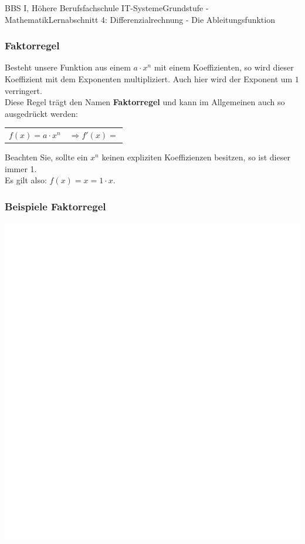 \documentclass[11pt,twocolumn,oneside,openany,headings=optiontotoc,11pt,numbers=noenddot]{article}
\begin{document}
\begin{worksheet}{BBS I, Höhere Berufsfachschule IT-Systeme}{Grundstufe - Mathematik}{Lernabschnitt 4: Differenzialrechnung - Die Ableitungsfunktion}
		\subsubsection{Faktorregel}
		Besteht unsere Funktion aus einem \(a\cdot x^n\) mit einem Koeffizienten, so wird dieser Koeffizient mit dem Exponenten multipliziert. Auch hier wird der Exponent um \(1\) verringert.\\
		Diese Regel trägt den Namen \textbf{Faktorregel} und kann im Allgemeinen auch so ausgedrückt werden:
		\begin{framed}
			\noindent
			\begin{tabularx}{0.8\textwidth}{XX}
				\(f(x) = a\cdot x^n\) & \(\Rightarrow f'(x) = \)
			\end{tabularx}
		\end{framed}
		\color{codegray} Beachten Sie, sollte ein \(x^n\) keinen expliziten Koeffizienzen besitzen, so ist dieser immer 1.\\
		Es gilt also: \colorbox{green!5}{\(f(x) = x = 1\cdot x\)}.
		\normalcolor
		\subsubsection*{Beispiele Faktorregel}
		\includegraphics[scale=0.2]{../../empty.jpg}\\

\end{worksheet}
\end{document}
